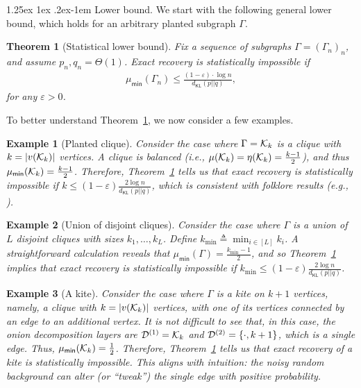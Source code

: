 \documentclass[12pt]{article}
\makeatletter
\newtheorem{example}{Example}
\newtheorem{theorem}{Theorem}
\newcommand{\calD}{{\cal D}}
\newcommand{\calK}{{\cal K}}
\newcommand{\s}[1]{\mathsf{#1}}
\renewcommand{\paragraph}{%
  \@startsection{paragraph}{4}%
  {\z@}{1.25ex \@plus 1ex \@minus .2ex}{-1em}%
  {\normalfont\normalsize\bfseries}%
}
\makeatother
\begin{document}
\paragraph{Lower bound.} We start with the following general lower bound, which holds for an arbitrary planted subgraph $\Gamma$.
\begin{theorem}[Statistical lower bound]\label{thm:lowerp1}
Fix a sequence of subgraphs $\Gamma=(\Gamma_n)_n$, and assume $p_n,q_n=\Theta(1)$. %
Exact recovery is statistically impossible if
\begin{align} 
        \mu_{\s{min}}(\Gamma_n)\leq \frac{(1-\varepsilon)\cdot \log n}{d_{\s{KL}}(p||q)},\label{eq:condDenseStat}
\end{align}
for any $\varepsilon>0$.
\end{theorem}

To better understand Theorem~\ref{thm:lowerp1}, we now consider a few examples.
\begin{example}[Planted clique]
    Consider the case where $\Gamma = \calK_k$ is a clique with $k = |v(\calK_k)|$ vertices. A clique is balanced (i.e., $\mu(\calK_k) = \eta(\calK_k) = \frac{k-1}{2}$), and thus $\mu_{\s{min}}(\calK_k) = \frac{k-1}{2}$. Therefore, Theorem~\ref{thm:lowerp1} tells us that exact recovery is statistically impossible if $k \leq (1 - \varepsilon)\frac{2\log n}{d_{\s{KL}}(p||q)}$, which is consistent with folklore results (e.g., \cite{jerrum1992large}).
\end{example}

\begin{example}[Union of disjoint cliques]
Consider the case where $\Gamma$ is a union of $L$ disjoint cliques with sizes $k_1,\dots,k_L$. Define $k_{\min}\triangleq \min_{i\in[L]} k_i$. A straightforward calculation reveals that $\mu_{\s{min}}(\Gamma) = \frac{k_{\min}-1}{2}$, and so Theorem~\ref{thm:lowerp1} implies that exact recovery is statistically impossible if $k_{\min} \leq (1 - \varepsilon)\frac{2\log n}{d_{\s{KL}}(p||q)}$.
\end{example}

\begin{example}[A kite]\label{examp:kite}
    Consider the case where $\Gamma$ is a kite on $k+1$ vertices, namely, a clique with $k = |v(\calK_k)|$ vertices, with one of its vertices connected by an edge to an additional vertex. It is not difficult to see that, in this case, the onion decomposition layers are $\calD^{(1)} = \calK_k$ and $\calD^{(2)} = \{\cdot, k+1\}$, which is a single edge. Thus, $\mu_{\s{min}}(\calK_k) = \frac{1}{2}$. Therefore, Theorem~\ref{thm:lowerp1} tells us that exact recovery of a kite is statistically impossible. This aligns with intuition: the noisy random background can alter (or ``tweak'') the single edge with positive probability. 
\end{example}
\end{document}
